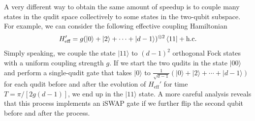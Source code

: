 \documentclass[twocolumn,english,pra,superscriptaddress]{revtex4-1}
\begin{document}
A very different way to obtain the same amount of speedup is to couple many states in the qudit space collectively to some states in the two-qubit subspace. For example, we can consider the following effective coupling Hamiltonian
\begin{equation}\label{Heff2}
    H_{\text{eff}}'= g (|0\rangle + |2\rangle + \cdots + |d-1\rangle)^{\otimes 2} \bra{11} + \text{h.c.}
\end{equation}
Simply speaking, we couple the state $|11\rangle$ to $(d-1)^2$ orthogonal Fock states with a uniform coupling strength $g$. If we start the two qudits in the state $|00\rangle$ and perform a single-qudit gate that takes $|0\rangle$ to $\frac{1}{\sqrt{d-1}}( |0\rangle + |2\rangle + \cdots + |d-1\rangle)$ for each qudit before and after the evolution of $ H_{\text{eff}}'$ for time $T= \pi/[2g(d-1)]$, we end up in the $|11\rangle$ state. A more careful analysis reveals that this process implements an iSWAP gate if we further flip the second qubit before and after the process.
\end{document}
